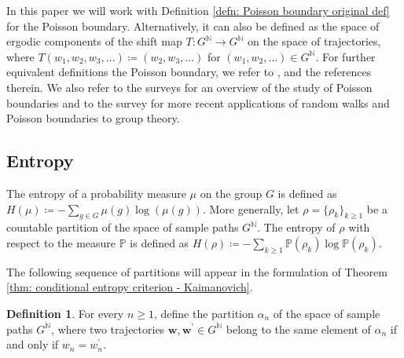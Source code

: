 \documentclass[reqno,oneside,11pt]{amsart}
\renewcommand{\P}{\mathbb{P}}
\theoremstyle{plain}
\theoremstyle{definition}
\newtheorem{defn}[thm]{Definition} %
\begin{document}
In this paper we will work with Definition \ref{defn: Poisson boundary original def} for the Poisson boundary. Alternatively, it can also be defined as the space of ergodic components of the shift map $T:G^{\mathbb{N}}\to G^{\mathbb{N}}$ on the space of trajectories, where $T(w_1,w_2,w_3,\ldots)\coloneqq (w_2,w_3,\ldots)$ for $(w_1,w_2,\ldots)\in G^{\mathbb{N}}$. For further equivalent definitions the Poisson boundary, we refer to \cite{KaimanovcihVershik1983}, \cite[Section 1]{Kaimanovich2000} and the references therein. We also refer to the surveys \cite{Furman2002,Erschler2010} for an overview of the study of Poisson boundaries and to the survey \cite{Zheng2022} for more recent applications of random walks and Poisson boundaries to group theory.

\subsection{Entropy}\label{subsection: entropy}

The entropy of a probability measure $\mu$ on the group $G$ is defined as $H(\mu)\coloneqq -\sum_{g\in G}\mu(g)\log(\mu(g))$. More generally, let $\rho=\{\rho_k\}_{k\ge 1}$ be a countable partition of the space of sample paths $G^{\mathbb{N}}$. The entropy of $\rho$ with respect to the measure $\P$ is defined as $
	H(\rho)\coloneqq -\sum_{k\ge 1}\P(\rho_k)\log \P(\rho_k).$

The following sequence of partitions will appear in the formulation of Theorem \ref{thm: conditional entropy criterion - Kaimanovich}.

\begin{defn}\label{def: partition rw at time n}
	For every $n\ge 1$, define the partition $\alpha_n$ of the space of sample paths $G^{\mathbb{N}}$, where two trajectories $\mathbf{w},\mathbf{w^\prime}\in G^{\mathbb{N}}$ belong to the same element of $\alpha_n$ if and only if $w_n=w^\prime_n$.
\end{defn} 
\end{document}
